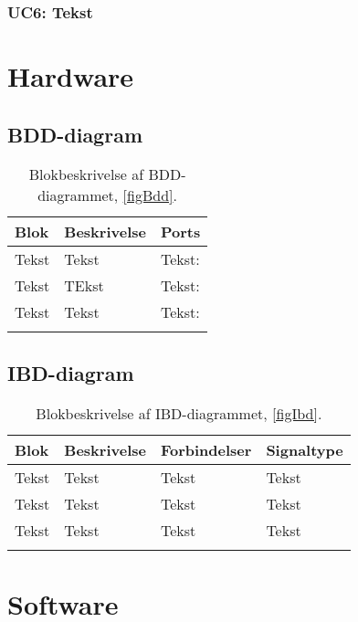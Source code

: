 %
\subsubsection{UC6: Tekst}





\section{Hardware}

\subsection{BDD-diagram}



\begin{longtabu} to 
    Blok &    Beskrivelse &    Ports\\[-1ex]
    \midrule
    Tekst & Tekst   &   Tekst:\\
    Tekst &    TEkst &   Tekst:\\
    Tekst & Tekst &    Tekst:\\
\caption{Blokbeskrivelse af BDD-diagrammet, \cref{figBdd}.}
\label{tabelBdd}
\end{longtabu}

\subsection{IBD-diagram}

\begin{figure}[H]
\end{figure}

\begin{longtabu} to 
    Blok &    Beskrivelse &    Forbindelser &    Signaltype\\[-1ex]
    \midrule
    Tekst &    Tekst &    Tekst &    Tekst\\
    Tekst &    Tekst &    Tekst &    Tekst\\
    Tekst &    Tekst &    Tekst &    Tekst\\
    \caption{Blokbeskrivelse af IBD-diagrammet, \cref{figIbd}.}
    \label{tabelIbd}
\end{longtabu}



\section{Software}


